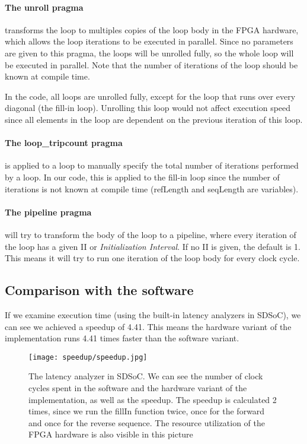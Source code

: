 \paragraph{The unroll pragma} transforms the loop to multiples copies of the loop body in the FPGA hardware, which allows the loop iterations to be executed in parallel. Since no parameters are given to this pragma, the loops will be unrolled fully, so the whole loop will be executed in parallel. Note that the number of iterations of the loop should be known at compile time.

In the code, all loops are unrolled fully, except for the loop that runs over every diagonal (the fill-in loop). Unrolling this loop would not affect execution speed since all elements in the loop are dependent on the previous iteration of this loop.

\paragraph{The loop\_tripcount pragma} is applied to a loop to manually specify the total number of iterations performed by a loop. In our code, this is applied to the fill-in loop since the number of iterations is not known at compile time (refLength and seqLength are variables).

\paragraph{The pipeline pragma} will try to transform the body of the loop to a pipeline, where every iteration of the loop has a given II or \emph{Initialization Interval}. If no II is given, the default is 1. This means it will try to run one iteration of the loop body for every clock cycle. 

\subsection{Comparison with the software}

If we examine execution time (using the built-in latency analyzers in SDSoC), we can see we achieved a speedup of 4.41. This means the hardware variant of the implementation runs 4.41 times faster than the software variant.

\begin{figure}[H]
	\centering
	\texttt{[image: speedup/speedup.jpg]}
	\caption{The latency analyzer in SDSoC. We can see the number of clock cycles spent in the software and the hardware variant of the implementation, as well as the speedup. The speedup is calculated 2 times, since we run the fillIn function twice, once for the forward and once for the reverse sequence. The resource utilization of the FPGA hardware is also visible in this picture}
	\label{fig:speedup}
\end{figure}